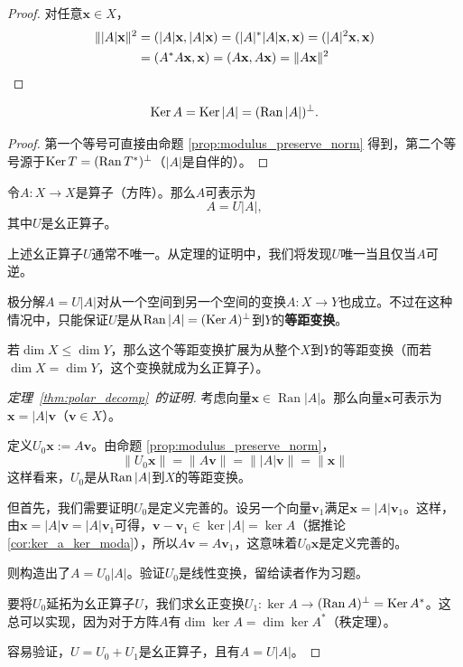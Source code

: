 \begin{proof}
    对任意$\mathbf{x}\in X$，
    \begin{align*}
        \||A|\mathbf{x}\|^{2}&=(|A|\mathbf{x},|A|\mathbf{x})=(|A|^*|A|\mathbf{x},\mathbf{x})=(|A|^2\mathbf{x},\mathbf{x})\\
        &=(A^*A\mathbf{x},\mathbf{x})=(A\mathbf{x},A\mathbf{x})=\|A\mathbf{x}\|^2\qedhere
    \end{align*}
\end{proof}

\begin{corollary}\label{cor:ker_a_ker_moda}
    \[\operatorname{Ker} A=\operatorname{Ker} |A|=(\operatorname{Ran} |A|)^\perp.\]
\end{corollary}
\begin{proof}
    第一个等号可直接由命题 \ref{prop:modulus_preserve_norm} 得到，第二个等号源于$\operatorname{Ker} T=(\operatorname{Ran} T^*)^\perp$（$|A|$是自伴的）。
\end{proof}
\begin{theorem}[算子的极分解]\label{thm:polar_decomp}
    令$A:X\to X$是算子（方阵）。那么$A$可表示为\[A=U|A|,\]其中$U$是幺正算子。
\end{theorem}
\begin{remark*}
    上述幺正算子$U$通常不唯一。从定理的证明中，我们将发现$U$唯一当且仅当$A$可逆。
\end{remark*}
\begin{remark*}
    极分解$A=U|A|$对从一个空间到另一个空间的变换$A:X\to Y$也成立。不过在这种情况中，只能保证$U$是从$\operatorname{Ran} |A|=(\operatorname{Ker} A)^\perp$到$Y$的{\bf 等距变换}。

    若$\dim X\le \dim Y$，那么这个等距变换扩展为从整个$X$到$Y$的等距变换（而若$\dim X=\dim Y$，这个变换就成为幺正算子）。
\end{remark*}

\begin{proof}[定理~\ref{thm:polar_decomp}~的证明]
    考虑向量$\mathbf{x}\in\operatorname{Ran}|A|$。那么向量$\mathbf{x}$可表示为$\mathbf{x}=|A|\mathbf{v}$（$\mathbf{v}\in X$）。

    定义$U_0\mathbf{x}:=A\mathbf{v}$。由命题 \ref{prop:modulus_preserve_norm}，
    \[\|U_0\mathbf{x}\|=\|A\mathbf{v}\|=\||A|\mathbf{v}\|=\|\mathbf{x}\|\]
    这样看来，$U_0$是从$\operatorname{Ran} |A|$到$X$的等距变换。

    但首先，我们需要证明$U_0$是定义完善的。设另一个向量$\mathbf{v}_1$满足$\mathbf{x}=|A|\mathbf{v}_1$。这样，由$\mathbf{x}=|A|\mathbf{v}=|A|\mathbf{v}_1$可得，$\mathbf{v}-\mathbf{v}_1\in\ker|A|=\ker A$（据推论 \ref{cor:ker_a_ker_moda}），所以$A\mathbf{v}=A\mathbf{v}_1$，这意味着$U_0\mathbf{x}$是定义完善的。

    则构造出了$A=U_0|A|$。验证$U_0$是线性变换，留给读者作为习题。

    要将$U_0$延拓为幺正算子$U$，我们求幺正变换$U_1:\ker A\to$\linebreak $(\operatorname{Ran} A)^\perp=\operatorname{Ker} A^*$。这总可以实现，因为对于方阵$A$有$\dim\ker A=\dim\ker A^*$（秩定理）。

    容易验证，$U=U_0+U_1$是幺正算子，且有$A=U|A|$。
\end{proof}

